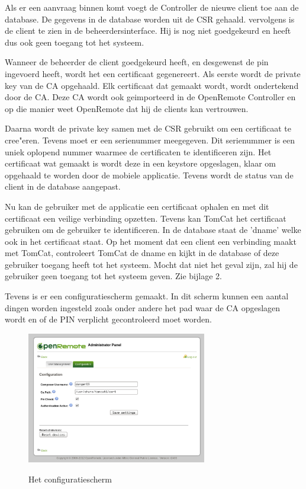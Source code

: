 \documentclass[]{article}
\begin{document}
Als er een aanvraag binnen komt voegt de Controller de nieuwe client toe aan de
database. De gegevens in de database worden uit de CSR gehaald. vervolgens is de
client te zien in de beheerdersinterface. Hij is nog niet
goedgekeurd en heeft dus ook geen toegang tot het systeem.

Wanneer de beheerder de client goedgekeurd heeft, en desgewenst de pin ingevoerd
heeft, wordt het een certificaat gegenereert. Als eerste
wordt de private key van de CA opgehaald. Elk certificaat dat gemaakt wordt,
wordt ondertekend door de CA. Deze CA wordt ook geimporteerd in de OpenRemote
Controller en op die manier weet OpenRemote dat hij de clients kan vertrouwen.

Daarna wordt de private key samen met de CSR gebruikt om een certificaat te
cree"eren. Tevens moet er een serienummer meegegeven. Dit serienummer is een
uniek oplopend nummer waarmee de certificaten te identificeren zijn. Het
certificaat wat gemaakt is wordt deze in een keystore
opgeslagen, klaar om opgehaald te worden door de mobiele applicatie. Tevens wordt de
status van de client in de database aangepast.

Nu kan de gebruiker met de applicatie een certificaat ophalen en met dit
certificaat een veilige verbinding opzetten. Tevens kan TomCat het certificaat
gebruiken om de gebruiker te identificeren. In de database staat de 'dname'
welke ook in het certificaat staat. Op het moment dat een client een verbinding
maakt met TomCat, controleert TomCat de dname en kijkt in de database of deze
gebruiker toegang heeft tot het systeem. Mocht dat niet het geval zijn, zal hij
de gebruiker geen toegang tot het systeem geven.
Zie bijlage 2.

Tevens is er een
configuratiescherm gemaakt. In dit scherm kunnen een aantal dingen worden
ingesteld zoals onder andere het pad waar de CA opgeslagen wordt en of de PIN
verplicht gecontroleerd moet worden.

\begin{figure}[h!]
  \centering
    \includegraphics[width=0.7\textwidth,keepaspectratio]{adminv2config.pdf}
  \label{fig:adminv2config}
  \caption{Het configuratiescherm}
\end{figure}
\end{document}
